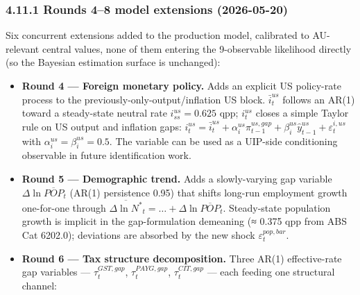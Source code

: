 \documentclass[
]{article}
\newcounter{none} %
\begin{document}
\subsubsection{4.11.1 Rounds 4--8 model extensions
(2026-05-20)}\label{rounds-48-model-extensions-2026-05-20}

Six concurrent extensions added to the production model, calibrated to
AU-relevant central values, none of them entering the 9-observable
likelihood directly (so the Bayesian estimation surface is unchanged):

\begin{itemize}
\item
  \textbf{Round 4 --- Foreign monetary policy.} Adds an explicit US
  policy-rate process to the previously-only-output/inflation US block.
  \(\bar{i}^{us}_t\) follows an AR(1) toward a steady-state neutral rate
  \(i^{us}_{ss} = 0.625\) qpp; \(i^{us}_t\) closes a simple Taylor rule
  on US output and inflation gaps:
  \(i^{us}_t = \bar{i}^{us}_t + \alpha_i^{us} \pi^{us,gap}_{t-1} + \beta_i^{us} \hat{y}^{us}_{t-1} + \varepsilon^{i,us}_t\)
  with \(\alpha_i^{us} = \beta_i^{us} = 0.5\). The variable can be used
  as a UIP-side conditioning observable in future identification work.
\item
  \textbf{Round 5 --- Demographic trend.} Adds a slowly-varying gap
  variable \(\Delta \ln \overline{POP}_t\) (AR(1) persistence 0.95) that
  shifts long-run employment growth one-for-one through
  \(\overline{\Delta \ln N^*}_t = \dots + \Delta \ln \overline{POP}_t\).
  Steady-state population growth is implicit in the gap-formulation
  demeaning (≈ 0.375 qpp from ABS Cat 6202.0); deviations are absorbed
  by the new shock \(\varepsilon^{pop,bar}_t\).
\item
  \textbf{Round 6 --- Tax structure decomposition.} Three AR(1)
  effective-rate gap variables --- \(\tau^{GST,gap}_t\),
  \(\tau^{PAYG,gap}_t\), \(\tau^{CIT,gap}_t\) --- each feeding one
  structural channel:


\end{itemize}
\end{document}
